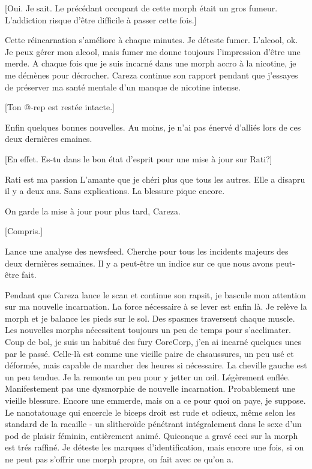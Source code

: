 [Oui. Je sait. Le précédant occupant de cette morph était un gros fumeur. L'addiction risque d'être difficile à passer cette fois.] 

Cette réincarnation s'améliore à chaque minutes. Je déteste fumer. L'alcool, ok. Je peux gérer mon alcool, mais fumer me donne toujours l'impression d'être une merde. A chaque fois que je suis incarné dans une morph accro à la nicotine, je me démènes pour décrocher. Careza continue son rapport pendant que j'essayes de préserver ma santé mentale d'un manque de nicotine intense. 

[Ton @-rep est restée intacte.] 

Enfin quelques bonnes nouvelles. Au moins, je n'ai pas énervé d'alliés lors de ces deux dernières emaines. 

[En effet. Es-tu dans le bon état d'esprit pour une mise à jour sur Rati?] 

Rati est ma passion L'amante que je chéri plus que tous les autres. Elle a disapru il y a deux ans. Sans explications. La blessure pique encore. 

On garde la mise à jour pour plus tard, Careza. 

[Compris.] 

Lance une analyse des newsfeed. Cherche pour tous les incidents majeurs des deux dernières semaines. Il y a peut-être un indice sur ce que nous avons peut-être fait. 

Pendant que Careza lance le scan et continue son rapsit, je bascule mon attention sur ma nouvelle incarnation. La force nécessaire à se lever est enfin là. Je relève la morph et je balance les pieds sur le sol. Des spasmes traversent chaque muscle. Les nouvelles morphs nécessitent toujours un peu de temps pour s'acclimater. Coup de bol, je suis un habitué des fury CoreCorp, j'en ai incarné quelques unes par le passé. Celle-là est comme une vieille paire de chsaussures, un peu usé et déformée, mais capable de marcher des heures si nécessaire. La cheville gauche est un peu tendue. Je la remonte un peu pour y jetter un œil. Légèrement enflée. Manifestement pas une dysmorphie de nouvelle incarnation. Probablement une vieille blessure. Encore une emmerde, mais on a ce pour quoi on paye, je suppose. Le nanotatouage qui encercle le biceps droit est rude et odieux, même selon les standard de la racaille - un slitheroïde pénétrant intégralement dans le sexe d'un pod de plaisir féminin, entièrement animé. Quiconque a gravé ceci sur la morph est trés raffiné. Je déteste les marques d'identification, mais encore une fois, si on ne peut pas s'offrir une morph propre, on fait avec ce qu'on a. 

